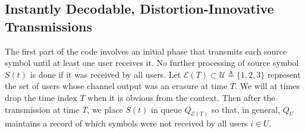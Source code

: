 \subsection{Instantly Decodable, Distortion-Innovative Transmissions}
\label{subsec:instantly_decodable}

The first part of the code involves
an initial phase that transmits each source symbol until at least one user receives it.  No further processing of source symbol $S(t)$ is done if it was received by all users.  Let $\mathcal{E}(T) \subset \mathcal{U} \triangleq \{1, 2, 3\}$ represent the set of users whose channel output was an erasure at time $T$.  We will at times drop the time index $T$ when it is obvious from the context.  Then after the transmission at time $T$, we place $S(t)$ in queue $Q_{\mathcal{E}(T)}$ so that, in general, $Q_{U}$ maintains a record of which symbols were not received by all users $i \in U$.


